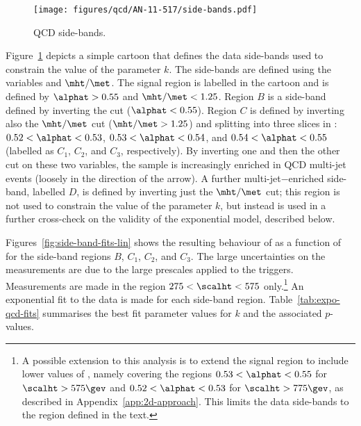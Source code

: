 \begin{figure}[!h]
  \begin{center}
    \texttt{[image: figures/qcd/AN-11-517/side-bands.pdf]}
    \caption{QCD side-bands.}
    \label{fig:side-bands}
  \end{center}
\end{figure}

Figure~\ref{fig:side-bands} depicts a simple cartoon that defines the
data side-bands used to constrain the value of the parameter $k$. The
side-bands are defined using the variables \alphat and
$\mht/\met$. The signal region is labelled in the cartoon and is
defined by $\alphat > 0.55$ and $\mht/\met < 1.25$. Region $B$ is a
side-band defined by inverting the \alphat cut (\ie $\alphat <
0.55$). Region $C$ is defined by inverting also the $\mht/\met$ cut
(\ie $\mht/\met > 1.25$) and splitting into three slices in \alphat:
$0.52 < \alphat < 0.53$, $0.53 < \alphat < 0.54$, and $0.54 < \alphat
< 0.55$ (labelled as $C_1$, $C_2$, and $C_3$, respectively). By
inverting one and then the other cut on these two variables, the
sample is increasingly enriched in QCD multi-jet events (loosely in
the direction of the arrow). A further multi-jet$-$enriched side-band,
labelled $D$, is defined by inverting just the $\mht/\met$ cut; this
region is not used to constrain the value of the parameter $k$, but
instead is used in a further cross-check on the validity of the
exponential model, described below.

Figures~\ref{fig:side-band-fits-lin} shows the resulting behaviour of
\RaT as a function of \scalht for the side-band regions $B$, $C_1$,
$C_2$, and $C_3$. The large uncertainties on the measurements are due
to the large prescales applied to the \httrigger
triggers. Measurements are made in the region $275 < \scalht < 575$
only.\footnote{A possible extension to this analysis is to extend the
  signal region to include lower values of \alphat, namely covering
  the regions $0.53 < \alphat < 0.55$ for $\scalht > 575\gev$ and
  $0.52 < \alphat < 0.53$ for $\scalht > 775\gev$, as described in
  Appendix~\ref{app:2d-approach}. This limits the data side-bands to
  the \scalht region defined in the text.} An exponential fit to the
data is made for each side-band region. Table~\ref{tab:expo-qcd-fits}
summarises the best fit parameter values for $k$ and the associated
$p$-values.


